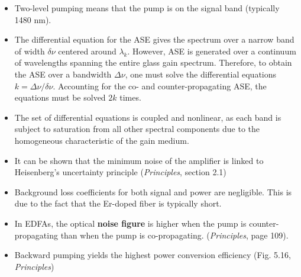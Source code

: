 \documentclass[a4paper]{article}
\begin{document}
\begin{itemize}
	\item Two-level pumping means that the pump is on the signal band (typically 1480 nm).
	\item The differential equation for the ASE gives the spectrum over a narrow band of width $\delta\nu$ centered around $\lambda_k$. However, ASE is generated over a continuum of wavelengths spanning the entire glass gain spectrum. Therefore, to obtain the ASE over a bandwidth $\Delta\nu$, one must solve the differential equations $k = \Delta\nu/\delta\nu$. Accounting for the co- and counter-propagating ASE, the equations must be solved $2k$ times.
	\item The set of differential equations is coupled and nonlinear, as each band is subject to saturation from all other spectral components due to the homogeneous characteristic of the gain medium. 
	\item It can be shown that the minimum noise of the amplifier is linked to Heisenberg's uncertainty principle (\textit{Principles}, section 2.1) 
	\item Background loss coefficients for both signal and power are negligible. This is due to the fact that the Er-doped fiber is typically short.
	\item In EDFAs, the optical \textbf{noise figure} is higher when the pump is counter-propagating than when the pump is co-propagating. (\textit{Principles}, page 109).
	\item Backward pumping yields the highest power conversion efficiency (Fig. 5.16, \textit{Principles})
\end{itemize}




\end{document}
